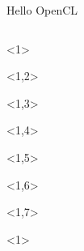 \documentclass[@BEAMER_OPTIONS@]{beamer}
\begin{document}
\begin{frame}[fragile]{Hello OpenCL}
    \vspace{-1\baselineskip}
    \begin{columns}
        \begin{column}[c]{0.25\textwidth}
            \begin{exampleblock}{}
                \begin{adjustbox}{width=0.25\textwidth, height=\textheight, keepaspectratio}
                    \begin{minipage}{\textwidth}
                        \begin{uncoverenv}<1>
                            
                        \end{uncoverenv}
                        \begin{uncoverenv}<1,2>
                            
                        \end{uncoverenv}
                        \begin{uncoverenv}<1,3>
                            
                        \end{uncoverenv}
                        \begin{uncoverenv}<1,4>
                            
                        \end{uncoverenv}
                        \begin{uncoverenv}<1,5>
                            
                        \end{uncoverenv}
                        \begin{uncoverenv}<1,6>
                            
                        \end{uncoverenv}
                        \begin{uncoverenv}<1,7>
                            
                        \end{uncoverenv}
                        \begin{uncoverenv}<1>

\end{uncoverenv}
\end{minipage}
\end{adjustbox}
\end{exampleblock}
\end{column}
\end{columns}
\end{frame}
\end{document}
